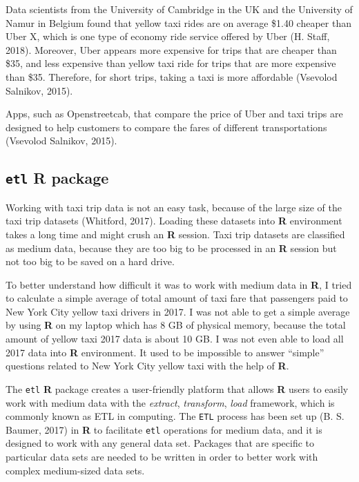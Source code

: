 \documentclass[12pt,twoside]{reedthesis}
\theoremstyle{definition}
\theoremstyle{definition}
\theoremstyle{definition}
\theoremstyle{remark}
\begin{document}
Data scientists from the University of Cambridge in the UK and the
University of Namur in Belgium found that yellow taxi rides are on
average \$1.40 cheaper than Uber X, which is one type of economy ride
service offered by Uber (H. Staff, 2018). Moreover, Uber appears more
expensive for trips that are cheaper than \$35, and less expensive than
yellow taxi ride for trips that are more expensive than \$35. Therefore,
for short trips, taking a taxi is more affordable (Vsevolod Salnikov,
2015).

Apps, such as Openstreetcab, that compare the price of Uber and taxi
trips are designed to help customers to compare the fares of different
transportations (Vsevolod Salnikov, 2015).

\subsection{\texorpdfstring{\texttt{etl} R
package}{etl R package}}\label{etl-r-package}

Working with taxi trip data is not an easy task, because of the large
size of the taxi trip datasets (Whitford, 2017). Loading these datasets
into \textbf{R} environment takes a long time and might crush an
\textbf{R} session. Taxi trip datasets are classified as medium data,
because they are too big to be processed in an \textbf{R} session but
not too big to be saved on a hard drive.

To better understand how difficult it was to work with medium data in
\textbf{R}, I tried to calculate a simple average of total amount of
taxi fare that passengers paid to New York City yellow taxi drivers in
2017. I was not able to get a simple average by using \textbf{R} on my
laptop which has 8 GB of physical memory, because the total amount of
yellow taxi 2017 data is about 10 GB. I was not even able to load all
2017 data into \textbf{R} environment. It used to be impossible to
answer ``simple'' questions related to New York City yellow taxi with
the help of \textbf{R}.

The \texttt{etl} \textbf{R} package creates a user-friendly platform
that allows \textbf{R} users to easily work with medium data with the
\emph{extract}, \emph{transform}, \emph{load} framework, which is
commonly known as ETL in computing. The \texttt{ETL} process has been
set up (B. S. Baumer, 2017) in \textbf{R} to facilitate \texttt{etl}
operations for medium data, and it is designed to work with any general
data set. Packages that are specific to particular data sets are needed
to be written in order to better work with complex medium-sized data
sets.
\end{document}
